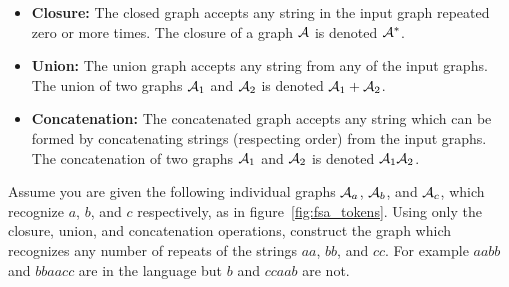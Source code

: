 \documentclass[main.tex]{subfiles}
\begin{document}
\begin{itemize}
    \item {\bf Closure:} The closed graph accepts any string in the input graph
        repeated zero or more times. The closure of a graph $\mathcal{A}$ is denoted
        $\mathcal{A}^*$.

    \item {\bf Union:} The union graph accepts any string from any of the input
        graphs. The union of two graphs $\mathcal{A}_1$ and $\mathcal{A}_2$ is denoted $\mathcal{A}_1 +
        \mathcal{A}_2$.

    \item {\bf Concatenation:} The concatenated graph accepts any string which
        can be formed by concatenating strings (respecting order) from the
        input graphs. The concatenation of two graphs $\mathcal{A}_1$ and $\mathcal{A}_2$ is
        denoted $\mathcal{A}_1\mathcal{A}_2$.

\end{itemize}

\begin{example}
Assume you are given the following individual graphs $\mathcal{A}_a$, $\mathcal{A}_b$, and
$\mathcal{A}_c$, which recognize $a$, $b$, and $c$ respectively, as in
figure~\ref{fig:fsa_tokens}. Using only the closure, union, and
concatenation operations, construct the graph which recognizes any number
of repeats of the strings $aa$, $bb$, and $cc$. For example $aabb$ and
$bbaacc$ are in the language but $b$ and $ccaab$ are not.
\end{example}
\end{document}
